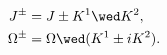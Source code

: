 \begin{equation}
\begin{aligned}
   J^\pm &= J \pm K^1\wed K^2 , \\
   \Omega^\pm &= \Omega \wed (K^1 \pm iK^2) .
\end{aligned}
\end{equation}

